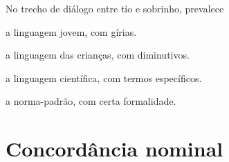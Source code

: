 
No trecho de diálogo entre tio e sobrinho, prevalece

\begin{escolha}
\item a linguagem jovem, com gírias.

\item a linguagem das crianças, com diminutivos.

\item a linguagem científica, com termos específicos.

\item a norma-padrão, com certa formalidade.
\end{escolha}

\chapter{Concordância nominal}


